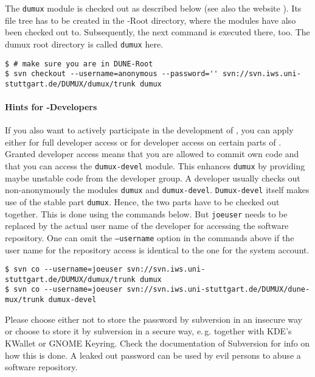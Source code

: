The \texttt{dumux} module is checked out as described below (see also the \Dumux website \cite{DUMUX-HP}).
Its file tree has to be created in the \Dune-Root directory, where the \Dune modules have also been checked out to. Subsequently, the next command
is executed there, too. The dumux root directory is called \texttt{dumux} here.

\begin{lstlisting}[style=Bash]
$ # make sure you are in DUNE-Root
$ svn checkout --username=anonymous --password='' svn://svn.iws.uni-stuttgart.de/DUMUX/dumux/trunk dumux
\end{lstlisting}

\paragraph{Hints for \Dumux-Developers}
If you also want to actively participate in the development of \Dumux, you can apply either for full developer
access or for developer access on certain parts of \Dumux. Granted developer access means that
you are allowed to commit own code and that you can access the \texttt{dumux-devel} module.
This enhances \texttt{dumux} by providing maybe unstable code from the developer group.
A developer usually checks out non-anonymously the modules \texttt{dumux} and \texttt{dumux-devel}. 
\texttt{Dumux-devel} itself makes use of the stable part \texttt{dumux}. Hence, the two parts have to be checked out together.
This is done using the commands below. But \texttt{joeuser} needs to be replaced by
the actual user name of the developer for accessing the software repository. 
One can omit the \texttt{--username} option in the commands above if the user name for the repository access is
identical to the one for the system account.

\begin{lstlisting}[style=Bash]
$ svn co --username=joeuser svn://svn.iws.uni-stuttgart.de/DUMUX/dumux/trunk dumux
$ svn co --username=joeuser svn://svn.iws.uni-stuttgart.de/DUMUX/dune-mux/trunk dumux-devel
\end{lstlisting}

Please choose either not to store the password by subversion in an insecure way or
choose to store it by subversion in a secure way, e.\,g. together with KDE's KWallet or GNOME Keyring.
Check the documentation of Subversion for info on how this is done.
A leaked out password can be used by evil persons to abuse a software repository.

